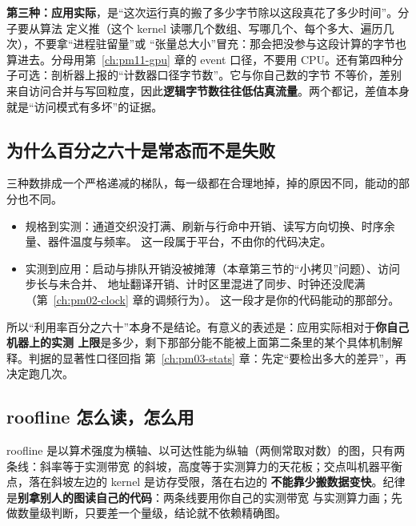 \documentclass[12pt,a4paper,fontset=fandol]{ctexbook}
\newcommand{\Lang}[1]{\textsf{#1}}
\newcommand{\MCpu}{\Lang{CPU}}
\begin{document}
\textbf{第三种：应用实际}，是``这次运行真的搬了多少字节除以这段真花了多少时间''。分子要从算法
定义推（这个 kernel 读哪几个数组、写哪几个、每个多大、遍历几次），不要拿``进程驻留量''或
``张量总大小''冒充：那会把没参与这段计算的字节也算进去。分母用第~\ref{ch:pm11-gpu} 章的 event
口径，不要用 \MCpu{}。还有第四种分子可选：剖析器上报的``计数器口径字节数''。它与你自己数的字节
不等价，差别来自访问合并与写回粒度，因此\textbf{逻辑字节数往往低估真流量}。两个都记，差值本身
就是``访问模式有多坏''的证据。

\subsection*{为什么百分之六十是常态而不是失败}
三种数排成一个严格递减的梯队，每一级都在合理地掉，掉的原因不同，能动的部分也不同。
\begin{itemize}
\item 规格到实测：通道交织没打满、刷新与行命中开销、读写方向切换、时序余量、器件温度与频率。
  这一段属于平台，不由你的代码决定。
\item 实测到应用：启动与排队开销没被摊薄（本章第三节的``小拷贝''问题）、访问步长与未合并、
  地址翻译开销、计时区里混进了同步、时钟还没爬满（第~\ref{ch:pm02-clock} 章的调频行为）。
  这一段才是你的代码能动的那部分。
\end{itemize}
所以``利用率百分之六十''本身不是结论。有意义的表述是：应用实际相对于\textbf{你自己机器上的实测
上限}是多少，剩下那部分能不能被上面第二条里的某个具体机制解释。判据的显著性口径回指
第~\ref{ch:pm03-stats} 章：先定``要检出多大的差异''，再决定跑几次。

\subsection*{roofline 怎么读，怎么用}
roofline 是以算术强度为横轴、以可达性能为纵轴（两侧常取对数）的图，只有两条线：斜率等于实测带宽
的斜坡，高度等于实测算力的天花板；交点叫机器平衡点，落在斜坡左边的 kernel 是访存受限，落在右边的
\textbf{不能靠少搬数据变快}。纪律是\textbf{别拿别人的图读自己的代码}：两条线要用你自己的实测带宽
与实测算力画；先做数量级判断，只要差一个量级，结论就不依赖精确图。
\end{document}
